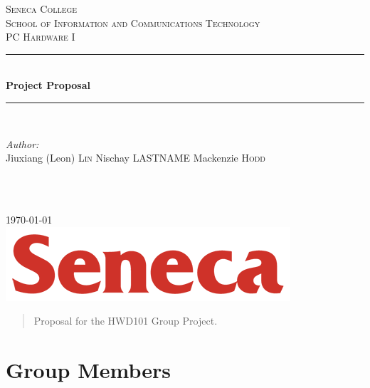 \documentclass[12pt]{article}
\begin{document}
\begin{titlepage}

\newcommand{\HRule}{\rule{\linewidth}{0.5mm}} %

\center %
 
\textsc{\LARGE Seneca College}\\[1.5cm]
\textsc{\Large School of Information and Communications Technology}\\[0.5cm]
\textsc{\large PC Hardware I}\\[0.5cm]

\HRule \\[0.4cm]
{ \huge \bfseries Project Proposal}\\[0.4cm] %
\HRule \\[1.5cm]
 
\begin{minipage}{0.4\textwidth}
\begin{flushleft} \large
\emph{Author:}\\
Jiuxiang (Leon) \textsc{Lin}
Nischay \textsc{LASTNAME}
Mackenzie \textsc{Hodd}
\end{flushleft}
\end{minipage}
~
\begin{minipage}{0.4\textwidth}
\begin{flushright} \large
\end{flushright}
\end{minipage}\\[2cm]

{\large \today}\\[2cm]

\includegraphics{logo.png}\\[1cm]

\vfill

\end{titlepage}


\begin{abstract}
Proposal for the HWD101 Group Project.	
\end{abstract}

\section{Group Members}
\end{document}
